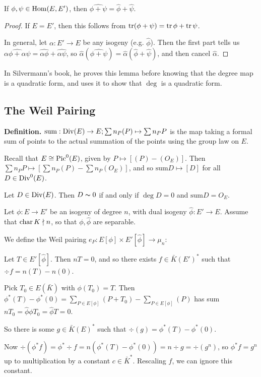 \documentclass[10pt,a4paper]{article}
\begin{document}
\begin{lemma}
  If $\phi, \psi \in \operatorname{Hom}(E, E')$, then $\hat{\phi+\psi} = \hat{\phi} + \hat{\psi}$.
\end{lemma}
\begin{proof}
  If $E=E'$, then this follows from $\operatorname{tr}(\phi + \psi) = \operatorname{tr}{\phi}+\operatorname{tr}{\psi}$.

  In general, let $\alpha: E' \to E$ be any isogeny (e.g. $\hat{\phi}$). Then the first part tells us $\hat{\alpha\phi + \alpha\psi} = \hat{\alpha\phi} + \hat{\alpha\psi}$, so $\hat{\alpha}(\hat{\phi+\psi}) = \hat{\alpha}(\hat{\phi}+\hat{\psi})$, and then cancel $\hat{\alpha}$.
\end{proof}
In Silvermann's book, he proves this lemma before knowing that the degree map is a quadratic form, and uses it to show that $\deg$ is a quadratic form.
\subsection{The Weil Pairing}
\textbf{Definition.} $\text{sum}:\operatorname{Div}(E) \to E; \sum n_P(P) \mapsto \sum n_P P$ is the map taking a formal sum of points to the actual summation of the points using the group law on $E$.

Recall that $E \cong \operatorname{Pic}^0(E)$, given by $P \mapsto [(P)-(O_E)]$. Then $\sum n_P P \mapsto [\sum n_P (P) - \sum n_P (O_E)]$, and so $\text{sum} D \mapsto [D]$ for all $D \in \operatorname{Div}^0(E)$.
\begin{lemma}
  Let $D \in \operatorname{Div}(E)$. Then $D\thicksim 0$ if and only if $\deg D = 0$ and $\text{sum}D = O_E$.
\end{lemma}
Let $\phi:E \to E'$ be an isogeny of degree $n$, with dual isogeny $\hat{\phi}:E' \to E$. Assume that $\operatorname{char} K \nmid n$, so that $\phi, \hat{\phi}$ are separable.

We define the Weil pairing $e_P: E[\phi]\times E'[\hat{\phi}] \to \mu_n$:

Let $T \in E'[\hat{\phi}]$. Then $nT = 0$, and so there exists $f \in \bar{K}(E')^\ast$ such that $\div f = n(T) - n(0)$.

Pick $T_0 \in E(\bar{K})$ with $\phi(T_0) = T$. Then $\phi^\ast(T) - \phi^\ast(0) = \sum_{P \in E[\phi]} (P+T_0) - \sum_{P \in E[\phi]}(P)$ has sum $n T_0 = \hat{\phi}\phi T_0 = \hat{\phi} T = 0$.

So there is some $g \in \bar{K}(E)^\ast$ such that $\div(g) = \phi^\ast(T) - \phi^\ast(0)$.

Now $\div(\phi^\ast f) = \phi^\ast \div f = n(\phi^\ast(T) - \phi^\ast(0)) = n\div g = \div(g^n)$, so $\phi^\ast f = g^n$ up to multiplication by a constant $c \in \bar{K}^\ast$. Rescaling $f$, we can ignore this constant.
\end{document}
